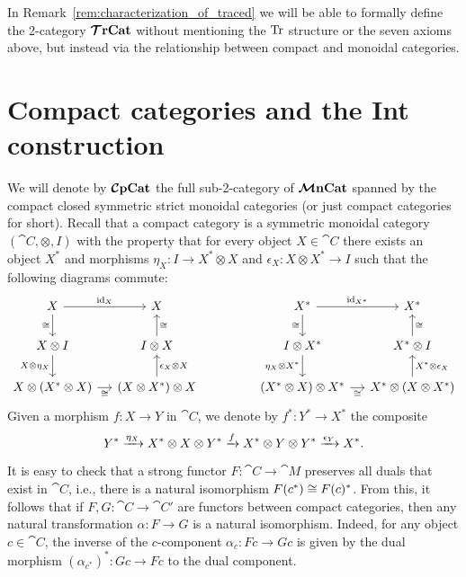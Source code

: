 \documentclass[11pt,oneside,article]{memoir}
\begin{document}
In Remark~\ref{rem:characterization_of_traced} we will be able to formally define the 2-category $\bm{\mathcal{T}}\mathbf{rCat}$ without mentioning the $\operatorname{Tr}$ structure or the seven axioms above, but instead via the relationship between compact and monoidal categories.

\section{Compact categories and the Int construction}\label{sec:compact_and_int}

We will denote by $\bm{\mathcal{C}}\mathbf{pCat}$ the full sub-2-category of $\bm{\mathcal{M}}\mathbf{nCat}$ spanned by the compact closed
symmetric strict monoidal categories (or just compact categories for short).  Recall that a compact
category is a symmetric monoidal category $(\cat{C},\otimes,I)$ with the property that for every
object
$X\in\cat{C}$ there exists an object $X^*$ and morphisms $\eta_X\colon I\to X^*\otimes X$ and
$\epsilon_X\colon X\otimes X^*\to I$ such that the following diagrams commute:
\begin{equation*}
   \begin{tikzcd}[column sep=small]
      X\arrow[r,"\id_X"]\arrow[d,"\cong"'] & X \\
      X\otimes I\arrow[d,"X\otimes\eta_X"'] & I\otimes X\arrow[u,"\cong"'] \\
      X\otimes(X^*\otimes X)\arrow[r,"\cong"'] & (X\otimes X^*)\otimes X\arrow[u,"\epsilon_X\otimes X"']
   \end{tikzcd}
   \hspace{.6in}
   \begin{tikzcd}[column sep=small]
      X^*\arrow[r,"\id_{X^*}"]\arrow[d,"\cong"'] & X^*\\
      I\otimes X^*\arrow[d,"\eta_X\otimes X^*"'] & X^*\otimes I\arrow[u,"\cong"'] \\
      (X^*\otimes X)\otimes X^*\arrow[r,"\cong"'] & X^*\otimes (X\otimes X^*)\arrow[u,"X^*\otimes\epsilon_X"']
   \end{tikzcd}
\end{equation*}
Given a morphism $f\colon X\to Y$ in $\cat{C}$, we denote by $f^*\colon Y^*\to X^*$ the composite
$$Y^*\xrightarrow{\eta_X}X^*\otimes X\otimes Y^* \xrightarrow{f}X^*\otimes Y\otimes Y^*\xrightarrow{\epsilon_Y}X^*.$$

It is easy to check that a strong functor $F\colon\cat{C}\to\cat{M}$ preserves all duals that exist in $\cat{C}$, i.e., there is a natural isomorphism $F(c^*)\cong F(c)^*$. From this, it follows that if $F,G\colon\cat{C}\to\cat{C'}$ are functors between compact categories, then any natural transformation $\alpha\colon F\to G$ is a natural isomorphism. Indeed, for any object $c\in\cat{C}$, the inverse of the $c$-component $\alpha_c\colon Fc\to Gc$ is given by the dual morphism $(\alpha_{c^*})^*\colon Gc\to Fc$ to the dual component.
\end{document}
